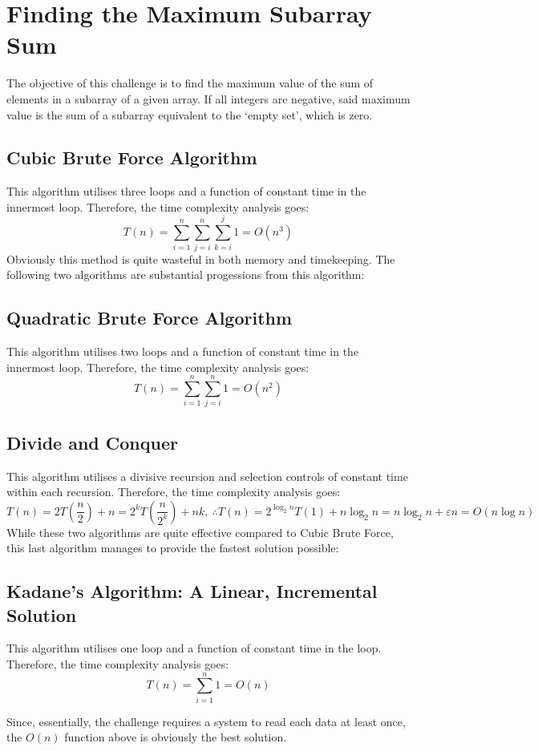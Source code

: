 \chapter{Finding the Maximum Subarray Sum}
The objective of this challenge is to find the maximum value of the sum of
elements in a subarray of a given array. If all integers are negative, said
maximum value is the sum of a subarray equivalent to the `empty set', which is
zero.

\section{Cubic Brute Force Algorithm}
This algorithm utilises three loops and a function of constant time in the
innermost loop. Therefore, the time complexity analysis goes:
\[ T(n)=\sum_{i=1}^n\sum_{j=i}^n\sum_{k=i}^j1=O\left(n^3\right) \]
Obviously this method is quite wasteful in both memory and timekeeping. The
following two algorithms are substantial progessions from this algorithm:
\newpage

\section{Quadratic Brute Force Algorithm}
This algorithm utilises two loops and a function of constant time in the
innermost loop. Therefore, the time complexity analysis goes:
\[ T(n)=\sum_{i=1}^n\sum_{j=i}^n1=O\left(n^2\right) \]

\section{Divide and Conquer}
This algorithm utilises a divisive recursion and selection controls of constant
time within each recursion. Therefore, the time complexity analysis goes:
\[ T(n)=2T\left(\frac{n}{2}\right)+n=2^kT\left(\frac{n}{2^k}\right)+nk,~
\therefore T(n)=2^{\log_2n}T(1)+n\log_2n=n\log_2n+\varepsilon n=O(n\log n) \]
\newpage
While these two algorithms are quite effective compared to Cubic Brute Force,
this last algorithm manages to provide the fastest solution possible:

\section{Kadane's Algorithm: A Linear, Incremental Solution}
This algorithm utilises one loop and a function of constant time in the loop.
Therefore, the time complexity analysis goes: \[ T(n)=\sum_{i=1}^n1=O(n) \]

Since, essentially, the challenge requires a system to read each data at least
once, the $O(n)$ function above is obviously the best solution.
